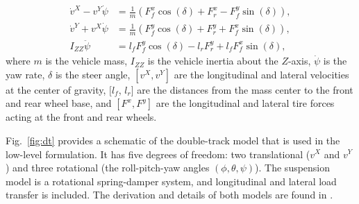 \documentclass[11pt,a4paper]{article}
\begin{document}
\begin{equation} 
\label{eq:cdc_ST}
\begin{aligned}
\dot{v}^X - v^Y \dot{\psi}  &= \frac{1}{m} ( F^x_{f}\cos(\delta) +
F^x_{r} -F^y_{f}\sin(\delta) ),  \\
\dot{v}^Y + v^X \dot{\psi}  &= \frac{1}{m} ( F^y_{f}\cos(\delta) +
F^y_{r} +F^x_{f}\sin(\delta) ), \\
I_{ZZ} \ddot{\psi}  &= l_f F^y_{f}\cos(\delta) - l_r F^y_{r} + l_fF^x_{f}\sin(\delta),
\end{aligned}
\end{equation}
where $m$ is the vehicle mass, $I_{ZZ}$ is the vehicle inertia
about the $Z$-axis,
$\dot{\psi}$ is the yaw rate, $\delta$ is the steer angle,
$[v^X,v^Y]$ are the longitudinal and lateral velocities at the
center of gravity, $[l_{f}$, $l_{r}]$ are the distances from the mass center
to the front and rear wheel base, and $[F^{x}, F^{y}]$ are the longitudinal and
lateral tire forces acting at the front and rear wheels.


Fig.~\ref{fig:dt} provides a schematic of the double-track model that is used in the low-level formulation. It has five degrees of freedom: two translational ($v^X$ and $v^Y$) and three rotational (the roll-pitch-yaw angles $(\phi,\theta,\psi)$). The suspension  model is a rotational spring-damper system, and longitudinal and lateral load transfer is included. The derivation and details of both models are found in \cite{berntorp2014phd,berntorp_model}.
\end{document}
